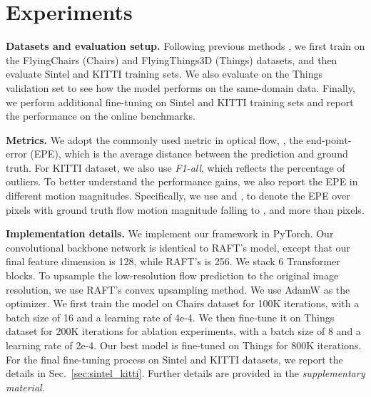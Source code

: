 \documentclass[10pt,twocolumn,letterpaper]{article}
\begin{document}
    
    




    
    

    





\section{Experiments}


{\bf Datasets and evaluation setup.} Following previous methods \cite{ilg2017flownet,sun2018pwc,teed2020raft}, we first train on the FlyingChairs (Chairs) \cite{dosovitskiy2015flownet} and FlyingThings3D (Things) \cite{mayer2016large} datasets, and then evaluate Sintel \cite{butler2012naturalistic} and KITTI \cite{menze2015object} training sets. We also evaluate on the Things validation set to see how the model performs on the same-domain data. Finally, we perform additional fine-tuning on Sintel and KITTI training sets and report the performance on the online benchmarks.



{\bf Metrics.} We adopt the commonly used metric in optical flow, \ie, the end-point-error (EPE), which is the average  distance between the prediction and ground truth. For KITTI dataset, we also use \emph{F1-all}, which reflects the percentage of outliers. To better understand the performance gains, we also report the EPE in different motion magnitudes. 
Specifically, we use  and , to denote the EPE over pixels with ground truth flow motion magnitude falling to ,  and more than  pixels.



{\bf Implementation details.} We implement our framework in PyTorch. Our convolutional backbone network is identical to RAFT's model, except that our final feature dimension is 128, while RAFT's is 256. We stack 6 Transformer blocks. To upsample the low-resolution flow prediction to the original image resolution, we use RAFT's convex upsampling \cite{teed2020raft} method. We use AdamW \cite{loshchilov2017decoupled} as the optimizer. We first train the model on Chairs dataset for 100K iterations, with a batch size of 16 and a learning rate of 4e-4. We then fine-tune it on Things dataset for 200K iterations for ablation experiments, with a batch size of 8 and a learning rate of 2e-4. Our best model is fine-tuned on Things for 800K iterations. For the final fine-tuning process on Sintel and KITTI datasets, we report the details in Sec.~\ref{sec:sintel_kitti}. Further details are provided in the \emph{supplementary material}.
\end{document}
